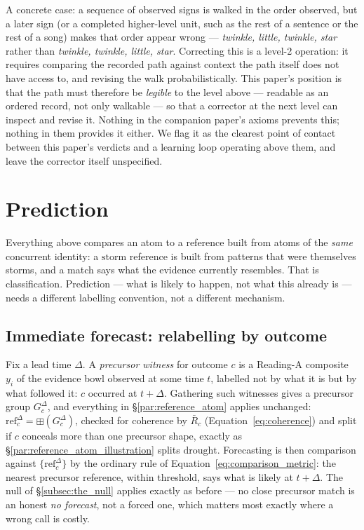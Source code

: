 \documentclass[12pt, a4paper]{article}
\begin{document}
A concrete case: a sequence of observed signs is walked in the order
observed, but a later sign (or a completed higher-level unit, such as
the rest of a sentence or the rest of a song) makes that order appear
wrong --- \emph{twinkle, little, twinkle, star} rather than
\emph{twinkle, twinkle, little, star}. Correcting this is a level-2
operation: it requires comparing the recorded path against context the
path itself does not have access to, and revising the walk
probabilistically. This paper's position is that the path must
therefore be \emph{legible} to the level above --- readable as an
ordered record, not only walkable --- so that a corrector at the next
level can inspect and revise it. Nothing in the companion paper's
axioms prevents this; nothing in them provides it either. We flag it
as the clearest point of contact between this paper's verdicts and a
learning loop operating above them, and leave the corrector itself
unspecified.

\section{Prediction}
\label{sec:prediction}

Everything above compares an atom to a reference built from atoms of
the \emph{same} concurrent identity: a $\mathrm{storm}$ reference is
built from patterns that were themselves storms, and a match says what
the evidence currently resembles. That is classification. Prediction
--- what is likely to happen, not what this already is --- needs a
different labelling convention, not a different mechanism.

\subsection{Immediate forecast: relabelling by outcome}
\label{subsec:immediate_forecast}

Fix a lead time $\Delta$. A \emph{precursor witness} for outcome $c$ is
a Reading-A composite $y_i$ of the evidence bowl observed at some time
$t$, labelled not by what it is but by what followed it: $c$ occurred
at $t+\Delta$. Gathering such witnesses gives a precursor group
$G_c^{\Delta}$, and everything in \S\ref{par:reference_atom} applies
unchanged: $\mathrm{ref}_c^{\Delta}=\boxplus(G_c^{\Delta})$, checked for
coherence by $\bar R_c$ (Equation~\eqref{eq:coherence}) and split if
$c$ conceals more than one precursor shape, exactly as
\S\ref{par:reference_atom_illustration} splits $\mathrm{drought}$.
Forecasting is then comparison against $\{\mathrm{ref}_c^{\Delta}\}$ by
the ordinary rule of Equation~\eqref{eq:comparison_metric}: the
nearest precursor reference, within threshold, says what is likely at
$t+\Delta$. The null of \S\ref{subsec:the_null} applies exactly as
before --- no close precursor match is an honest \emph{no forecast},
not a forced one, which matters most exactly where a wrong call is
costly.
\end{document}
